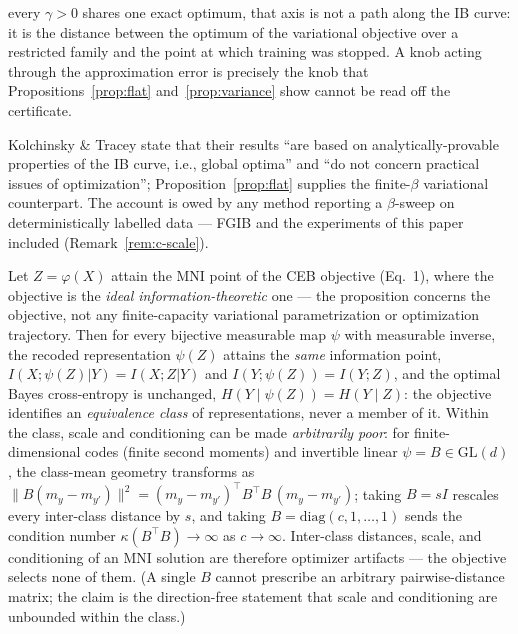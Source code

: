 \begin{remark}
\begin{enumerate}
every $\gamma > 0$ shares one exact optimum, that axis is not a path along the IB curve: it
is the distance between the optimum of the variational objective over a restricted family
and the point at which training was stopped. A knob acting through the approximation error
is precisely the knob that Propositions~\ref{prop:flat} and~\ref{prop:variance} show cannot
be read off the certificate.
\end{enumerate}
Kolchinsky \& Tracey state that their results ``are based on analytically-provable
properties of the IB curve, i.e., global optima'' and ``do not concern practical issues of
optimization''; Proposition~\ref{prop:flat} supplies the finite-$\beta$ variational
counterpart. The account is owed by any method reporting a $\beta$-sweep on
deterministically labelled data --- FGIB and the experiments of this paper included
(Remark~\ref{rem:c-scale}).
\end{remark}

\begin{proposition}\label{prop:geomet}
Let $Z = \varphi(X)$ attain the MNI point of the CEB objective (Eq.~1), where the
objective is the \emph{ideal information-theoretic} one --- the proposition concerns
the objective, not any finite-capacity variational parametrization or optimization
trajectory. Then for every bijective measurable map $\psi$ with measurable inverse,
the recoded representation
$\psi(Z)$ attains the \emph{same} information point,
$I(X;\psi(Z)|Y) = I(X;Z|Y)$ and $I(Y;\psi(Z)) = I(Y;Z)$, and the optimal Bayes
cross-entropy is unchanged, $H(Y \mid \psi(Z)) = H(Y \mid Z)$: the objective identifies
an \emph{equivalence class} of representations, never a member of it. Within the
class, scale and conditioning can be made \emph{arbitrarily poor}: for
finite-dimensional codes (finite second moments) and invertible linear
$\psi = B \in \mathrm{GL}(d)$, the class-mean geometry
transforms as
$\|B(m_y - m_{y'})\|^2 = (m_y - m_{y'})^{\top} B^{\top}B\,(m_y - m_{y'})$;
taking $B = sI$ rescales every inter-class distance by $s$, and taking
$B = \mathrm{diag}(c, 1, \dots, 1)$ sends the condition number
$\kappa(B^{\top}B) \to \infty$ as $c \to \infty$. Inter-class distances, scale, and
conditioning of an MNI solution are therefore optimizer artifacts --- the objective
selects none of them. (A single $B$ cannot prescribe an arbitrary pairwise-distance
matrix; the claim is the direction-free statement that scale and conditioning are
unbounded within the class.)
\end{proposition}


